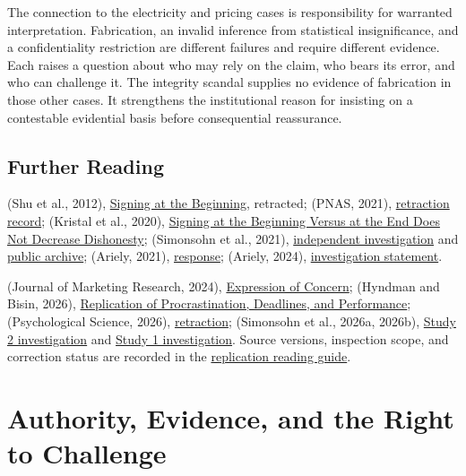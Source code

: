 The connection to the electricity and pricing cases is responsibility
for warranted interpretation. Fabrication, an invalid inference from
statistical insignificance, and a confidentiality restriction are
different failures and require different evidence. Each raises a
question about who may rely on the claim, who bears its error, and who
can challenge it. The integrity scandal supplies no evidence of
fabrication in those other cases. It strengthens the institutional
reason for insisting on a contestable evidential basis before
consequential reassurance.

\hypertarget{M09-further-reading-3}{%
\subsection{Further Reading}\label{M09-further-reading-3}}

\noindent (Shu et al., 2012),
\href{https://doi.org/10.1073/pnas.1209746109}{Signing at the
Beginning}, retracted; (PNAS, 2021),
\href{https://pubmed.ncbi.nlm.nih.gov/34518237/}{retraction record};
(Kristal et al., 2020),
\href{https://doi.org/10.1073/pnas.1911695117}{Signing at the Beginning
Versus at the End Does Not Decrease Dishonesty}; (Simonsohn et al.,
2021), \href{https://datacolada.org/98}{independent investigation} and
\href{https://researchbox.org/336}{public archive}; (Ariely, 2021),
\href{https://datacolada.org/wp-content/uploads/DanBlogComment_Aug_16_2021_final.pdf}{response};
(Ariely, 2024),
\href{https://danariely.com/wp-content/uploads/2024/04/ArielyEndofIStatment.pdf}{investigation
statement}.

(Journal of Marketing Research, 2024),
\href{https://doi.org/10.1177/00222437241285882}{Expression of Concern};
(Hyndman and Bisin, 2026),
\href{https://doi.org/10.1177/09567976261460772}{Replication of
Procrastination, Deadlines, and Performance}; (Psychological Science,
2026), \href{https://doi.org/10.1177/09567976261488042}{retraction};
(Simonsohn et al., 2026a, 2026b),
\href{https://datacolada.org/138}{Study 2 investigation} and
\href{https://datacolada.org/139}{Study 1 investigation}. Source
versions, inspection scope, and correction status are recorded in the
\href{../01_Resources/52_Research_Integrity_and_Replication/README.md}{replication
reading guide}.


\hypertarget{M09-authority-evidence-and-the-right-to-challenge}{%
\section{Authority, Evidence, and the Right to
Challenge}\label{M09-authority-evidence-and-the-right-to-challenge}}

